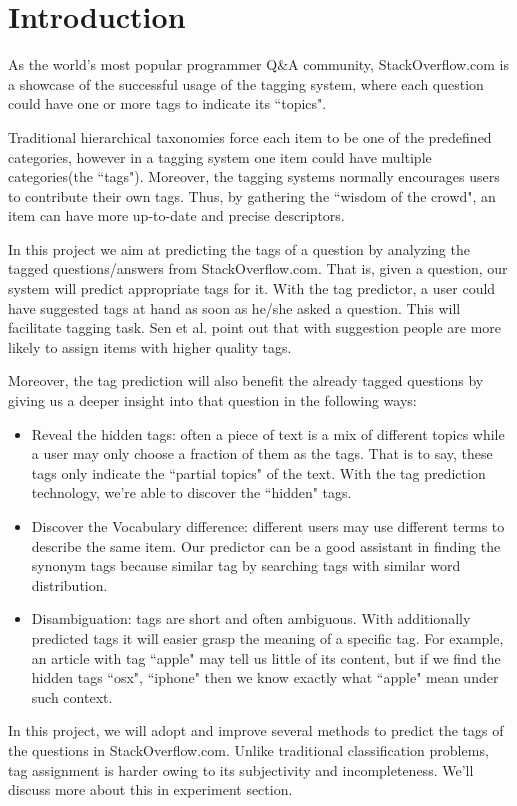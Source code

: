 \section{Introduction}
As the world's most popular programmer Q\&A community, StackOverflow.com is a showcase of the successful usage of the tagging system, where each question could have one or more tags to indicate its ``topics". 

Traditional hierarchical taxonomies force each item to be one of the predefined categories, however in a tagging system one item could have multiple categories(the ``tags"). Moreover, the tagging systems normally encourages users to contribute their own tags. Thus, by gathering the ``wisdom of the crowd", an item can have more up-to-date and precise descriptors.

In this project we aim at predicting the tags of a question by analyzing the tagged questions/answers from StackOverflow.com. That is, given a question, our system will predict appropriate tags for it. With the tag predictor, a user could have suggested tags at hand as soon as he/she asked a question. This will facilitate tagging task. Sen et al.\cite{Sen2006} point out that with suggestion people are more likely to assign items with higher quality tags.

Moreover, the tag prediction will also benefit the already tagged questions by giving us a deeper insight into that question in the following ways:

\begin{itemize}
    \item Reveal the hidden tags: often a piece of text is a mix of different topics while a user may only choose a fraction of them as the tags. That is to say, these tags only indicate the ``partial topics" of the text. With the tag prediction technology, we're able to discover the ``hidden" tags.
    \item Discover the Vocabulary difference: different users may use different terms to describe the same item. Our predictor can be a good assistant in finding the synonym tags because similar tag by searching tags with similar word distribution.
    \item Disambiguation: tags are short and often ambiguous. With additionally predicted tags it will easier grasp the meaning of a specific tag. For example, an article with tag ``apple" may tell us little of its content, but if we find the hidden tags ``osx", ``iphone" then we know exactly what ``apple" mean under such context.
\end{itemize}

In this project, we will adopt and improve several methods to predict the tags of the questions in StackOverflow.com. Unlike traditional classification problems, tag assignment is harder owing to its subjectivity and incompleteness. We'll discuss more about this in experiment section.
